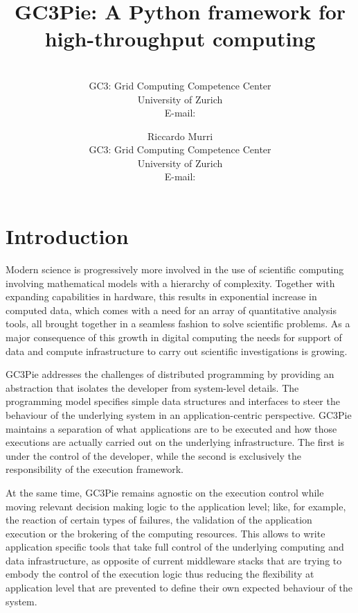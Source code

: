 \documentclass{PoS}
\title{GC3Pie: A Python framework for high-throughput computing}
\author{\speaker{Sergio MAFFIOLETTI}\\
        GC3: Grid Computing Competence Center\\
        University of Zurich \\
         E-mail: \email{sergio.maffioletti@gc3.uzh.ch}}
\author{Riccardo Murri\\
        GC3: Grid Computing Competence Center\\
        University of Zurich \\
        E-mail: \email{riccardo.murri@gmail.com}}
\begin{document}
\section{Introduction}

Modern science is progressively more involved in the use of scientific
computing involving mathematical models with a hierarchy of
complexity. Together with expanding capabilities in hardware, this
results in exponential increase in computed data, which comes with a
need for an array of quantitative analysis tools,
all brought together in a seamless fashion to solve scientific
problems. As a major consequence of this growth in digital computing
the needs for support of data and compute infrastructure to carry out
scientific investigations is growing.  

GC3Pie addresses the challenges of distributed programming by
providing an abstraction that isolates the developer from system-level
details. The programming model specifies simple data structures and
interfaces to steer the behaviour of the underlying system in an
application-centric perspective.
GC3Pie maintains a separation of what applications are to be executed
and how those executions are actually carried out on the underlying
infrastructure. The first is under the control of the developer, while
the second is exclusively the responsibility of the execution
framework. 

At the same time, GC3Pie remains agnostic on the execution control
while moving relevant decision making logic to the application
level; like, for example, the reaction of certain types of failures,
the validation of the application execution or the brokering of the
computing resources.
This allows to write application specific tools that take full
control of the underlying computing and data infrastructure, as
opposite of current middleware stacks that are trying to embody the
control of the execution logic thus reducing the flexibility at
application level that are prevented to define their own
expected behaviour of the system.
\end{document}

